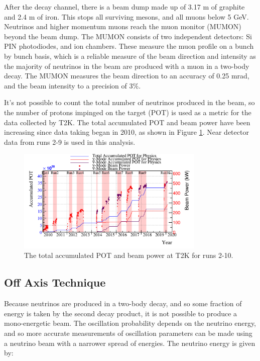 After the decay channel, there is a beam dump made up of 3.17 m of graphite and 2.4 m of iron. This stops all surviving mesons, and all muons below 5 GeV. Neutrinos and higher momentum muons reach the muon monitor (MUMON) beyond the beam dump. The MUMON consists of two independent detectors: Si PIN photodiodes, and ion chambers. These measure the muon profile on a bunch by bunch basis, which is a reliable measure of the beam direction and intensity as the majority of neutrinos in the beam are produced with a muon in a two-body decay. The MUMON measures the beam direction to an accuracy of 0.25 mrad, and the beam intensity to a precision of 3$\%$\cite{mumon}.

It's not possible to count the total number of neutrinos produced in the beam, so the number of protons impinged on the target (POT) is used as a metric for the data collected by T2K. The total accumulated POT and beam power have been increasing since data taking began in 2010, as shown in Figure \ref{fig:pot}. Near detector data from runs 2-9 is used in this analysis.

\begin{figure}
\centering
\includegraphics*[width=0.8\textwidth,clip]{figs/pow_t2k_all_toRun84}
\caption{The total accumulated POT and beam power at T2K for runs 2-10.} \label{fig:pot}
\end{figure}

\subsection{Off Axis Technique}

Because neutrinos are produced in a two-body decay, and so some fraction of energy is taken by the second decay product, it is not possible to produce a mono-energetic beam. The oscillation probability depends on the neutrino energy, and so more accurate measurements of oscillation parameters can be made using a neutrino beam with a narrower spread of energies. The neutrino energy is given by\cite{Enuoffaxis}:

